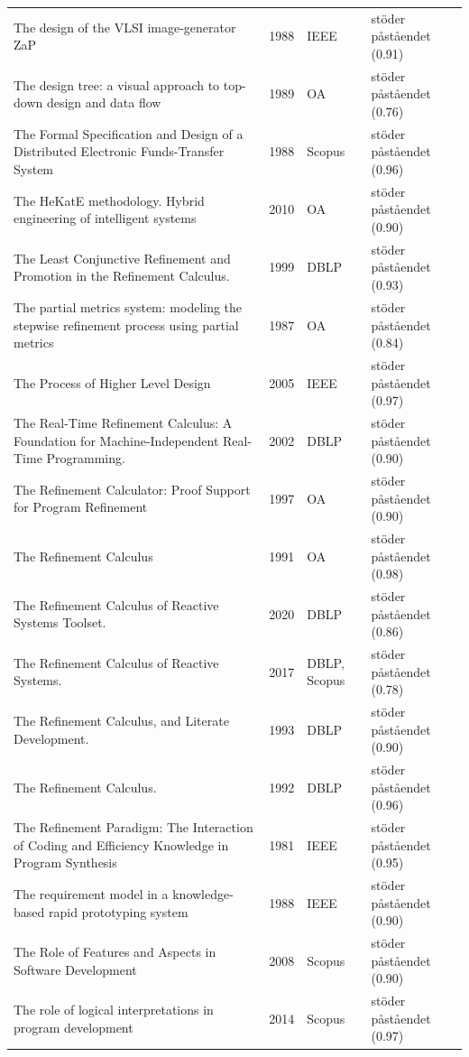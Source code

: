 \begin{longtable}{@{}%
  >{\raggedright\arraybackslash}p{}c%
  >{\raggedright\arraybackslash}p{}%
  >{\raggedright\arraybackslash}p{}@{}}
The design of the VLSI image-generator ZaP & 1988 & IEEE & stöder påståendet (0.91) \\
The design tree: a visual approach to top-down design and data flow & 1989 & OA & stöder påståendet (0.76) \\
The Formal Specification and Design of a Distributed Electronic Funds-Transfer System & 1988 & Scopus & stöder påståendet (0.96) \\
The HeKatE methodology. Hybrid engineering of intelligent systems & 2010 & OA & stöder påståendet (0.90) \\
The Least Conjunctive Refinement and Promotion in the Refinement Calculus. & 1999 & DBLP & stöder påståendet (0.93) \\
The partial metrics system: modeling the stepwise refinement process using partial metrics & 1987 & OA & stöder påståendet (0.84) \\
The Process of Higher Level Design & 2005 & IEEE & stöder påståendet (0.97) \\
The Real-Time Refinement Calculus: A Foundation for Machine-Independent Real-Time Programming. & 2002 & DBLP & stöder påståendet (0.90) \\
The Refinement Calculator: Proof Support for Program Refinement & 1997 & OA & stöder påståendet (0.90) \\
The Refinement Calculus & 1991 & OA & stöder påståendet (0.98) \\
The Refinement Calculus of Reactive Systems Toolset. & 2020 & DBLP & stöder påståendet (0.86) \\
The Refinement Calculus of Reactive Systems. & 2017 & DBLP, Scopus & stöder påståendet (0.78) \\
The Refinement Calculus, and Literate Development. & 1993 & DBLP & stöder påståendet (0.90) \\
The Refinement Calculus. & 1992 & DBLP & stöder påståendet (0.96) \\
The Refinement Paradigm: The Interaction of Coding and Efficiency Knowledge in Program Synthesis & 1981 & IEEE & stöder påståendet (0.95) \\
The requirement model in a knowledge-based rapid prototyping system & 1988 & IEEE & stöder påståendet (0.90) \\
The Role of Features and Aspects in Software Development & 2008 & Scopus & stöder påståendet (0.90) \\
The role of logical interpretations in program development & 2014 & Scopus & stöder påståendet (0.97) \\

\end{longtable}
